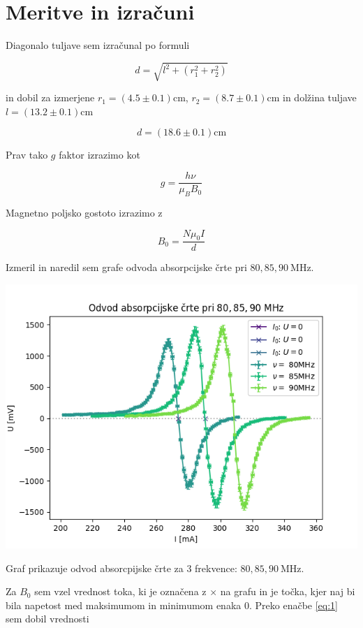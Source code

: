 \documentclass[11pt]{article}
\begin{document}
\section{Meritve in izračuni}\label{sec:org1f22431}

Diagonalo tuljave sem izračunal po formuli

\[ d = \sqrt{l ^2 + (r_1 ^2 + r_2 ^2)}
\]

in dobil za izmerjene \(r_1 = (4.5 \pm 0.1) \mathrm{cm}\), \(r_2 = (8.7 \pm 0.1) \mathrm{cm}\) in dolžina tuljave \(l = (13.2 \pm 0.1) \mathrm{cm}\)

\[ d = (18.6 \pm 0.1) \mathrm{cm}
\]

Prav tako \(g\) faktor izrazimo kot

\[ g = \frac{h \nu}{\mu_B B_0}
\]

Magnetno poljsko gostoto izrazimo z

\begin{equation}
\label{eq:1}
B_0 = \frac{N \mu_0 I}{d}
\end{equation}

Izmeril in naredil sem grafe odvoda absorpcijske črte pri \(80, 85, 90 \ \mathrm{MHz}\).

\begin{slika}[H]
  \centering
  \includegraphics[width=.9\linewidth]{figures/abs_crte.png}
  \caption{\small Graf prikazuje odvod absorcpijske črte za 3 frekvence: $80, 85, 90 \ \mathrm{MHz}$.}
\end{slika}

Za \(B_0\) sem vzel vrednost toka, ki je označena z \(\times\) na grafu in je točka, kjer naj bi bila napetost med maksimumom in minimumom enaka 0. Preko enačbe \ref{eq:1} sem dobil vrednosti
\end{document}
